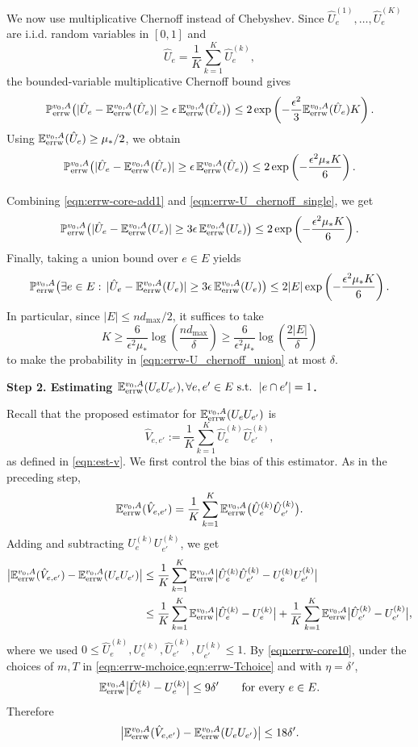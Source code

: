 \documentclass[a4paper, 11pt]{article}
\renewcommand{\P}{\mathbb{P}}
\newcommand{\E}{\mathbb{E}}
\newcommand{\Eerrw}{\E_{\textnormal{errw}}}
\newcommand{\Perrw}{\P_{\textnormal{errw}}}
\begin{document}
We now use multiplicative Chernoff instead of Chebyshev. Since
$\hat U_e^{(1)},\ldots,\hat U_e^{(K)}$ are i.i.d. random variables in $[0,1]$ and
\[
\hat U_e=\frac1K\sum_{k=1}^K\hat U_e^{(k)},
\]
the bounded-variable multiplicative Chernoff bound gives
\[
\Perrw^{v_0,A}\big(
|\hat U_e-\Eerrw^{v_0,A}(\hat U_e)|
\ge
\epsilon\,\Eerrw^{v_0,A}(\hat U_e)
\big)
\le
2\exp\left(
-\frac{\epsilon^2}{3}\Eerrw^{v_0,A}(\hat U_e)K
\right).
\]
Using $\Eerrw^{v_0,A}(\hat U_e)\ge\mu_*/2$, we obtain
\begin{equation}
\label{eqn:errw-U_chernoff_single}
\Perrw^{v_0,A}\big(
|\hat U_e-\Eerrw^{v_0,A}(\hat U_e)|
\ge
\epsilon\,\Eerrw^{v_0,A}(\hat U_e)
\big)
\le
2\exp\left(
-\frac{\epsilon^2\mu_*K}{6}
\right).
\end{equation}

Combining \eqref{eqn:errw-core-add1} and \eqref{eqn:errw-U_chernoff_single}, we get
\[
\Perrw^{v_0,A}\big(
|\hat U_e-\Eerrw^{v_0,A}(U_e)|
\ge
3\epsilon\,\Eerrw^{v_0,A}(U_e)
\big)
\le
2\exp\left(
-\frac{\epsilon^2\mu_*K}{6}
\right).
\]
Finally, taking a union bound over $e\in E$ yields
\begin{equation}
\label{eqn:errw-U_chernoff_union}
\Perrw^{v_0,A}\big(
\exists e\in E:\,
|\hat U_e-\Eerrw^{v_0,A}(U_e)|
\ge
3\epsilon\,\Eerrw^{v_0,A}(U_e)
\big)
\le
2|E|\exp\left(
-\frac{\epsilon^2\mu_*K}{6}
\right).
\end{equation}
In particular, since $|E|\le nd_{\max}/2$, it suffices to take
\[
K
\ge
\frac{6}{\epsilon^2\mu_*}
\log\left(\frac{nd_{\max}}{\delta}\right)
\ge 
\frac{6}{\epsilon^2\mu_*}
\log\left(\frac{2|E|}{\delta}\right)
\]
to make the probability in \eqref{eqn:errw-U_chernoff_union} at most $\delta$.

\textbf{Step 2. Estimating $\Eerrw^{v_0,A}(U_e U_{e'}), \forall e,e'\in E\text{ s.t. }\,|e\cap e'|=1$.}

Recall that the proposed estimator for $\Eerrw^{v_0,A}(U_eU_{e'})$ is
\[
\hat V_{e,e'}:=\frac1K\sum_{k=1}^K \hat U_e^{(k)}\hat U_{e'}^{(k)},
\]
as defined in \cref{eqn:est-v}. We first control the bias of this estimator. As in the preceding step,
\[
\Eerrw^{v_0,A}(\hat V_{e,e'})
=
\frac1K\sum_{k=1}^K
\Eerrw^{v_0,A}\big(\hat U_e^{(k)}\hat U_{e'}^{(k)}\big).
\]
Adding and subtracting \(U_e^{(k)}U_{e'}^{(k)}\), we get
\begin{align*}
\big|\Eerrw^{v_0,A}(\hat V_{e,e'})
-\Eerrw^{v_0,A}(U_eU_{e'})\big|
&\le
\frac1K\sum_{k=1}^K
\Eerrw^{v_0,A}\big|\hat U_e^{(k)}\hat U_{e'}^{(k)}
-U_e^{(k)}U_{e'}^{(k)}\big|  \\
&\le
\frac1K\sum_{k=1}^K
\Eerrw^{v_0,A}\big|\hat U_e^{(k)}-U_e^{(k)}\big|
+
\frac1K\sum_{k=1}^K
\Eerrw^{v_0,A}\big|\hat U_{e'}^{(k)}-U_{e'}^{(k)}\big|,
\end{align*}
where we used \(0\le \hat U_e^{(k)},U_e^{(k)},\hat U_{e'}^{(k)},U_{e'}^{(k)}\le1\).
By \cref{eqn:errw-core10}, under the choices of \(m,T\) in \cref{eqn:errw-mchoice,eqn:errw-Tchoice} and with \(\eta=\delta'\),
\[
\Eerrw^{v_0,A}\big|\hat U_e^{(k)}-U_e^{(k)}\big|\le 9\delta'
\qquad\text{for every }e\in E.
\]
Therefore
\begin{equation}
\label{eqn:errw-core11}
\big|\Eerrw^{v_0,A}(\hat V_{e,e'})
-\Eerrw^{v_0,A}(U_eU_{e'})\big|
\le 18\delta'.
\end{equation}
\end{document}
